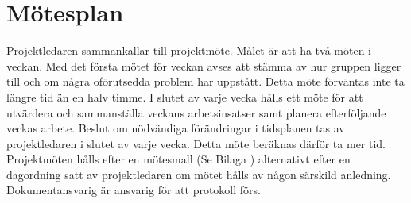 \section{Mötesplan}

Projektledaren sammankallar till projektmöte. Målet är att ha två möten i veckan. Med det första mötet för veckan avses att stämma av hur gruppen ligger till och om några oförutsedda problem har uppstått. Detta möte förväntas inte ta längre tid än en halv timme. I slutet av varje vecka hålls ett möte för att utvärdera och sammanställa veckans arbetsinsatser samt planera efterföljande veckas arbete. Beslut om nödvändiga förändringar i tidsplanen tas av projektledaren i slutet av varje vecka. Detta möte beräknas därför ta mer tid. \\
Projektmöten hålls efter en mötesmall (Se Bilaga ) alternativt efter en dagordning satt av projektledaren om mötet hålls av någon särskild anledning. Dokumentansvarig är ansvarig för att protokoll förs. 
